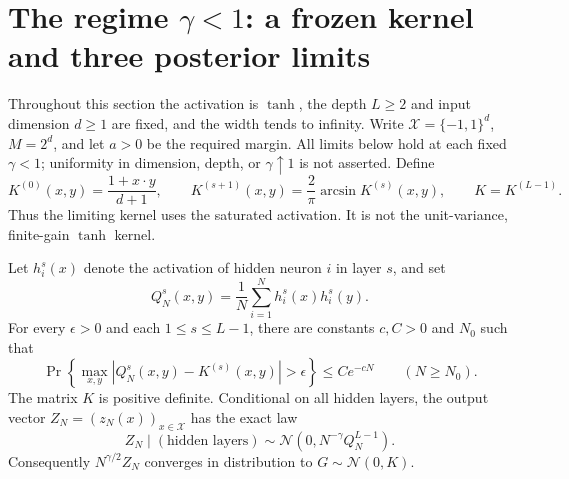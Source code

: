 \section{The regime \texorpdfstring{$\gamma<1$}{gamma < 1}: a frozen kernel and three posterior limits}
\label{sec:gamma-less-one}

Throughout this section the activation is $\tanh$, the depth $L\ge2$ and
input dimension $d\ge1$ are fixed, and the width tends to infinity. Write
$\mathcal X=\{-1,1\}^d$, $M=2^d$, and let $a>0$ be the required margin.
All limits below hold at each fixed $\gamma<1$; uniformity in dimension,
depth, or $\gamma\uparrow1$ is not asserted. Define
\begin{equation}\label{eq:arcsine-kernel}
 K^{(0)}(x,y)=\frac{1+x\cdot y}{d+1},\qquad
 K^{(s+1)}(x,y)=\frac2\pi\arcsin K^{(s)}(x,y),\qquad
 K=K^{(L-1)}.
\end{equation}
Thus the limiting kernel uses the saturated activation. It is not the
unit-variance, finite-gain $\tanh$ kernel.

\begin{theorem}
\label{thm:kernel-freezing}
Let $h_i^s(x)$ denote the activation of hidden neuron $i$ in layer $s$,
and set
\[
 Q_N^s(x,y)=\frac1N\sum_{i=1}^N h_i^s(x)h_i^s(y).
\]
For every $\epsilon>0$ and each $1\le s\le L-1$, there are constants
$c,C>0$ and $N_0$ such that
\[
 \Pr\!\left\{\max_{x,y}|Q_N^s(x,y)-K^{(s)}(x,y)|>\epsilon\right\}
 \le C e^{-cN}\qquad(N\ge N_0).
\]
The matrix $K$ is positive definite. Conditional on all hidden layers,
the output vector $Z_N=(z_N(x))_{x\in\mathcal X}$ has the exact law
\begin{equation}\label{eq:conditional-output-kernel}
 Z_N\mid (\text{hidden layers})\sim
 \mathcal N(0,N^{-\gamma}Q_N^{L-1}).
\end{equation}
Consequently $N^{\gamma/2}Z_N$ converges in distribution to
$G\sim\mathcal N(0,K)$.
\end{theorem}

